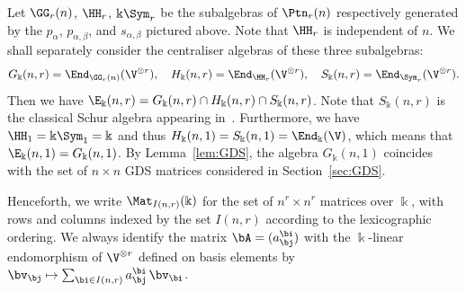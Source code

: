 Let $\GG_r(n)$, $\HH_r$, $\Bbbk\Sym_r$ be the subalgebras of
$\Ptn_r(n)$ respectively generated by the $p_\alpha$,
$p_{\alpha,\beta}$, and $s_{\alpha,\beta}$ pictured above. Note that
$\HH_r$ is independent of $n$. We shall separately consider the
centraliser algebras of these three subalgebras:
\[
G_\Bbbk(n,r) = \End_{\GG_r(n)}(\V^{\otimes r}), \quad
H_\Bbbk(n,r) = \End_{\HH_r} (\V^{\otimes r}), \quad %
S_\Bbbk(n,r) = \End_{\Sym_r} (\V^{\otimes r}).
\]
Then we have $\E_\Bbbk(n,r) = G_\Bbbk(n,r) \cap H_\Bbbk(n,r) \cap
S_\Bbbk(n,r)$. Note that $S_\Bbbk(n,r)$ is the classical Schur algebra
appearing in~\cite{Green:book}. Furthermore, we have
$\HH_1=\Bbbk\Sym_1=\Bbbk$ and thus
$H_\Bbbk(n,1)=S_\Bbbk(n,1)=\End_\Bbbk(\V)$, which means that
$\E_\Bbbk(n,1) = G_\Bbbk(n,1)$. By Lemma~\ref{lem:GDS}, the algebra
$G_\Bbbk(n,1)$ coincides with the set of $n \times n$ GDS matrices
considered in Section~\ref{sec:GDS}.

Henceforth, we write $\Mat_{I(n,r)}(\Bbbk)$ for the set of $n^r \times
n^r$ matrices over $\Bbbk$, with rows and columns indexed by the set
$I(n,r)$ according to the lexicographic ordering. We always identify
the matrix $\bA = (a^\bi_\bj)$ with the $\Bbbk$-linear endomorphism of
$\V^{\otimes r}$ defined on basis elements by $\bv_\bj \mapsto
\sum_{\bi \in I(n,r)} a^{\bi}_{\bj} \, \bv_{\bi}$.

